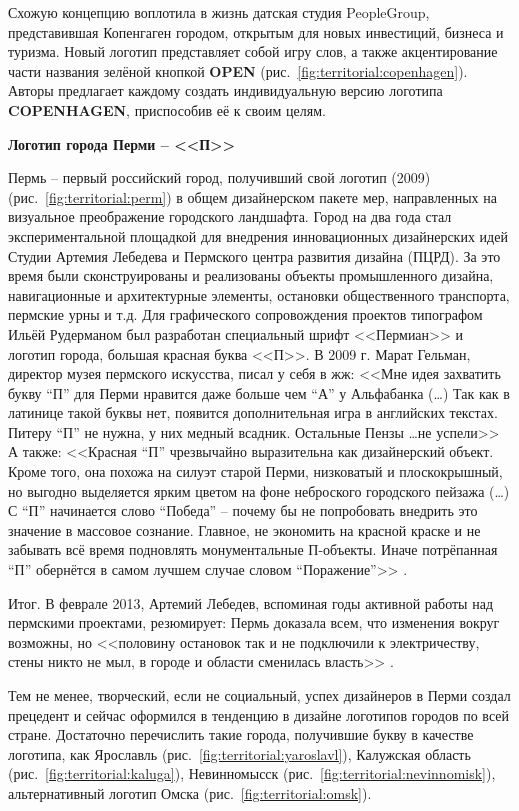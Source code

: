 Схожую концепцию воплотила в жизнь датская студия PeopleGroup, представившая Копенгаген городом,
открытым для новых инвестиций, бизнеса и туризма. Новый логотип представляет собой игру слов, а
также акцентирование части названия зелёной кнопкой \textbf{OPEN}
(рис.~\ref{fig:territorial:copenhagen}). Авторы предлагает каждому создать
индивидуальную версию логотипа \textbf{COPENHAGEN}, приспособив её к своим целям.

\textbf{Логотип города Перми -- <<П>>}

Пермь -- первый российский город, получивший свой логотип (2009) (рис.~\ref{fig:territorial:perm}) в
общем дизайнерском пакете мер, направленных на  визуальное преображение городского ландшафта.  Город
на два года стал экспериментальной площадкой для внедрения инновационных дизайнерских идей Студии
Артемия Лебедева и Пермского центра развития дизайна (ПЦРД). За это время были сконструированы и
реализованы объекты промышленного дизайна, навигационные и  архитектурные элементы, остановки
общественного транспорта, пермские урны и т.д. Для графического сопровождения проектов типографом
Ильёй Рудерманом был разработан  специальный шрифт <<Пермиан>> и логотип города, большая красная
буква <<П>>.  В 2009 г. Марат Гельман, директор музея пермского искусства, писал у себя в жж: <<Мне
идея захватить букву ``П'' для Перми нравится даже больше чем ``А'' у Альфабанка (\ldots) Так как в
латинице такой буквы нет, появится дополнительная игра в английских текстах. Питеру ``П'' не нужна,
у них медный всадник. Остальные Пензы \ldots не успели>> \autocite{link:gelman} А также: <<Красная
``П'' чрезвычайно выразительна как дизайнерский объект. Кроме того, она похожа на силуэт старой Перми,
низковатый и плоскокрышный, но выгодно выделяется ярким цветом на фоне неброского городского пейзажа
(\ldots) С ``П'' начинается слово ``Победа'' -- почему бы не попробовать внедрить это значение в массовое
сознание. Главное, не экономить на красной краске и не забывать всё время подновлять монументальные
П-объекты. Иначе потрёпанная ``П'' обернётся в самом лучшем случае словом
``Поражение''>> \autocite[][361]{book:gordon}.

Итог. В феврале 2013, Артемий Лебедев, вспоминая годы активной работы над пермскими проектами,
резюмирует: Пермь доказала всем, что изменения вокруг возможны, но <<половину остановок так и не
подключили к электричеству, стены никто не мыл, в городе и области сменилась власть>> \autocite{link:lebedev}.

Тем не менее, творческий, если не социальный, успех дизайнеров в Перми создал прецедент и сейчас
оформился в тенденцию в дизайне логотипов городов по всей стране.  Достаточно перечислить такие
города, получившие букву в качестве логотипа, как Ярославль (рис.~\ref{fig:territorial:yaroslavl}),
Калужская область (рис.~\ref{fig:territorial:kaluga}), Невинномысск
(рис.~\ref{fig:territorial:nevinnomisk}), альтернативный логотип Омска (рис.~\ref{fig:territorial:omsk}).

